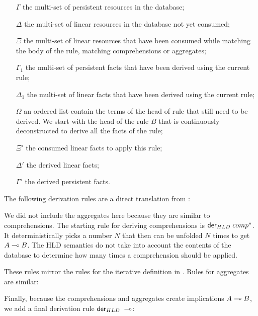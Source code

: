 \begin{enumerate}

   \item[$\Gamma$] the multi-set of persistent resources in the database;

   \item[$\Delta$] the multi-set of linear resources in the database not yet
   consumed;

   \item[$\Xi$] the multi-set of linear resources that have been consumed while
   matching the body of the rule, matching comprehensions or aggregates;

   \item[$\Gamma_1$] the multi-set of persistent facts that have been derived
   using the current rule;

   \item[$\Delta_1$] the multi-set of linear facts that have been derived using
   the current rule;

   \item[$\Omega$] an ordered list contain the terms of the head of rule that
   still need to be derived. We start with the head of the rule $B$ that is
   continuously deconstructed to derive all the facts of the rule;

   \item[$\Xi'$] the consumed linear facts to apply this rule;

   \item[$\Delta'$] the derived linear facts;

   \item[$\Gamma'$] the derived persistent facts.

\end{enumerate}

The following derivation rules are a direct translation from \fragment:



We did not include the aggregates here because they are similar to comprehensions.
The starting rule for deriving comprehensions is $\mathsf{der}_{HLD} \; comp^*$. It
deterministically picks a number $N$ that then can be unfolded $N$ times to get
$A \multimap B$. The HLD semantics do not take into account the contents of the
database to determine how many times a comprehension should be applied.



These rules mirror the rules for the iterative definition in \fragment.  Rules
for aggregates are similar:



Finally, because the comprehensions and aggregates create implications $A \multimap
B$, we add a final derivation rule $\mathsf{der}_{HLD} \; \multimap$:


